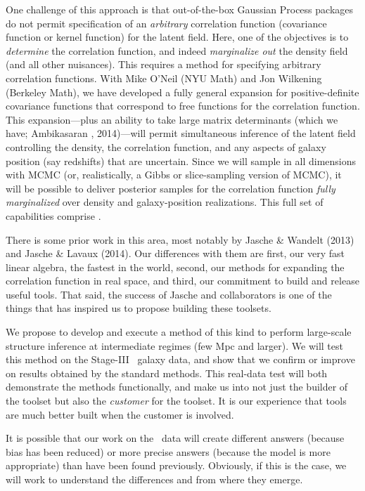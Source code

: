 \documentclass[12pt]{article}
\begin{document}
One challenge of this approach is that out-of-the-box Gaussian Process
packages do not permit specification of an \emph{arbitrary}
correlation function (covariance function or kernel function) for the
latent field.
Here, one of the objectives is to \emph{determine} the correlation
function, and indeed \emph{marginalize out} the density field (and all
other nuisances).
This requires a method for specifying arbitrary correlation functions.
With Mike O'Neil (NYU Math) and Jon Wilkening (Berkeley Math), we have
developed a fully general expansion for positive-definite covariance
functions that correspond to free functions for the correlation
function.
This expansion---plus an ability to take large matrix determinants
(which we have; Ambikasaran \etal, 2014)---will permit simultaneous inference of the
latent field controlling the density, the correlation function, and
any aspects of galaxy position (say redshifts) that are uncertain.
Since we will sample in all dimensions with MCMC (or, realistically, a
Gibbs or slice-sampling version of MCMC), it will be possible to
deliver posterior samples for the correlation function \emph{fully
  marginalized} over density and galaxy-position realizations.
This full set of capabilities comprise .

There is some prior work in this area, most notably by Jasche \&
Wandelt (2013) and Jasche \& Lavaux (2014).
Our differences with them are first, our very fast linear algebra, the
fastest in the world, second, our methods for expanding the
correlation function in real space, and third, our commitment to build
and release useful tools.
That said, the success of Jasche and collaborators is one of the
things that has inspired us to propose building these toolsets.

We propose to develop and execute a method of this kind to perform
large-scale structure inference at intermediate regimes (few Mpc and
larger).
We will test this method on the Stage-III \boss\ galaxy data, and show
that we confirm or improve on results obtained by the standard
methods.
This real-data test will both demonstrate the methods functionally,
and make us into not just the builder of the toolset but also the
\emph{customer} for the toolset.
It is our experience that tools are much better built when the
customer is involved.

It is possible that our work on the \boss\ data will create
different answers (because bias has been reduced) or more precise
answers (because the model is more appropriate) than have been found
previously.
Obviously, if this is the case, we will work to understand the
differences and from where they emerge.
\end{document}

